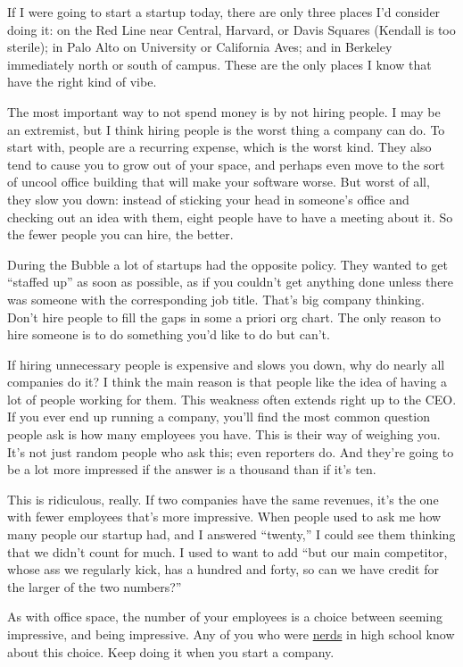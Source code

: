 \documentclass[12pt]{book}
\begin{document}
If I were going to start a startup today, there are only three places
I'd consider doing it: on the Red Line near Central, Harvard, or Davis
Squares (Kendall is too sterile); in Palo Alto on University or
California Aves; and in Berkeley immediately north or south of campus.
These are the only places I know that have the right kind of vibe.

The most important way to not spend money is by not hiring people. I may
be an extremist, but I think hiring people is the worst thing a company
can do. To start with, people are a recurring expense, which is the
worst kind. They also tend to cause you to grow out of your space, and
perhaps even move to the sort of uncool office building that will make
your software worse. But worst of all, they slow you down: instead of
sticking your head in someone's office and checking out an idea with
them, eight people have to have a meeting about it. So the fewer people
you can hire, the better.

During the Bubble a lot of startups had the opposite policy. They wanted
to get ``staffed up'' as soon as possible, as if you couldn't get
anything done unless there was someone with the corresponding job title.
That's big company thinking. Don't hire people to fill the gaps in some
a priori org chart. The only reason to hire someone is to do something
you'd like to do but can't.

If hiring unnecessary people is expensive and slows you down, why do
nearly all companies do it? I think the main reason is that people like
the idea of having a lot of people working for them. This weakness often
extends right up to the CEO. If you ever end up running a company,
you'll find the most common question people ask is how many employees
you have. This is their way of weighing you. It's not just random people
who ask this; even reporters do. And they're going to be a lot more
impressed if the answer is a thousand than if it's ten.

This is ridiculous, really. If two companies have the same revenues,
it's the one with fewer employees that's more impressive. When people
used to ask me how many people our startup had, and I answered
``twenty,'' I could see them thinking that we didn't count for much. I
used to want to add ``but our main competitor, whose ass we regularly
kick, has a hundred and forty, so can we have credit for the larger of
the two numbers?''

As with office space, the number of your employees is a choice between
seeming impressive, and being impressive. Any of you who were
\href{nerds.html}{nerds} in high school know about this choice. Keep
doing it when you start a company.
\end{document}
